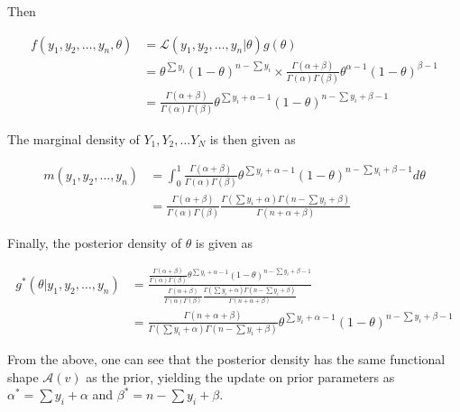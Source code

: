 Then

\begin{equation*}
      \begin{split}
            f(y_{1}, y_{2}, \dots, y_{n}, \theta)
            &= \mathcal{L}(y_{1}, y_{2}, \dots, y_{n} \vert \theta)g(\theta)\\
            &= \theta^{\sum y_{i}}(1-\theta)^{n-\sum y_{i}} \times \frac{\Gamma(\alpha + \beta)}{\Gamma(\alpha)\Gamma(\beta)}\theta^{\alpha - 1}(1 - \theta)^{\beta  - 1}\\
            &= \frac{\Gamma(\alpha + \beta)}{\Gamma(\alpha)\Gamma(\beta)}\theta^{\sum y_{i} + \alpha - 1}(1-\theta)^{n - \sum y_{i} + \beta - 1}
      \end{split}
\end{equation*}

The marginal density of $Y_{1}, Y_{2}, \dots Y_{N}$ is then given as

\begin{equation*}
      \begin{split}
            m(y_{1}, y_{2}, \dots, y_{n})
            &= \int_{0}^{1}\frac{\Gamma(\alpha + \beta)}{\Gamma(\alpha)\Gamma(\beta)}\theta^{\sum y_{i} + \alpha - 1}(1-\theta)^{n - \sum y_{i} + \beta - 1}d\theta\\
            &= \frac{\Gamma(\alpha + \beta)}{\Gamma(\alpha)\Gamma(\beta)}\frac{\Gamma(\sum y_{i} + \alpha)\Gamma(n - \sum y_{i} + \beta)}{\Gamma(n + \alpha + \beta)}
      \end{split}
\end{equation*}

Finally, the posterior density of $\theta$ is given as

\begin{equation*}
      \begin{split}
            g^{*}(\theta \vert y_{1}, y_{2}, \dots, y_{n})
            &= \frac{\frac{\Gamma(\alpha + \beta)}{\Gamma(\alpha)\Gamma(\beta)}\theta^{\sum y_{i} + \alpha - 1}(1-\theta)^{n - \sum y_{i} + \beta - 1}}{\frac{\Gamma(\alpha + \beta)}{\Gamma(\alpha)\Gamma(\beta)}\frac{\Gamma(\sum y_{i} + \alpha)\Gamma(n - \sum y_{i} + \beta)}{\Gamma(n + \alpha + \beta)}}\\
            &= \frac{\Gamma(n + \alpha + \beta)}{\Gamma(\sum y_{i} + \alpha)\Gamma(n - \sum y_{i} + \beta)}\theta^{\sum y_{i} + \alpha - 1}(1-\theta)^{n - \sum y_{i} + \beta - 1}
      \end{split}
\end{equation*}

From the above, one can see that the posterior density has the same functional shape $\mathcal{A}(v)$ as the prior, yielding the update on prior parameters as $\alpha^{*} = \sum y_{i} + \alpha$ and $\beta^{*} = n - \sum y_{i} + \beta$.

